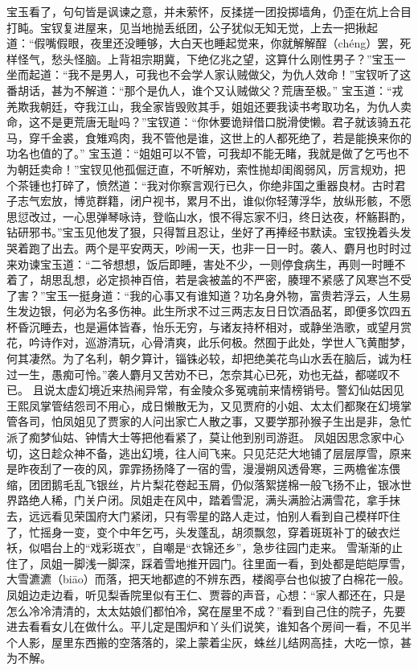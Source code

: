 \documentclass[12pt,oneside]{book}
\begin{document}
宝玉看了，句句皆是讽谏之意，并未萦怀，反揉搓一团投掷墙角，仍歪在炕上合目打盹。宝钗复进屋来，见当地抛丢纸团，公子犹似无知无觉，上去一把揪起道：“假嘴假眼，夜里还没睡够，大白天也睡起觉来，你就解解酲（chéng）罢，死样怪气，愁头怪脑。上背祖宗期冀，下绝亿兆之望，这算什么刚性男子？”宝玉一坐而起道：“我不是男人，可我也不会学人家认贼做父，为仇人效命！”宝钗听了这番胡话，甚为不解道：“那个是仇人，谁个又认贼做父？荒唐至极。”
宝玉道：“戎羌欺我朝廷，夺我江山，我全家皆毁败其手，姐姐还要我读书考取功名，为仇人卖命，这不是更荒唐无耻吗？”宝钗道：“你休要诡辩借口脱滑使懒。君子就该骑五花马，穿千金裘，食雉鸡肉，我不管他是谁，这世上的人都死绝了，若是能换来你的功名也值的了。”
宝玉道：“姐姐可以不管，可我却不能无睹，我就是做了乞丐也不为朝廷卖命！”宝钗见他孤倔迂直，不听解劝，索性抛却闺阁弱风，厉言规劝，把个茶锺也打碎了，愤然道：“我对你察言观行已久，你绝非国之重器良材。古时君子志气宏放，博览群籍，闭户视书，累月不出，谁似你轻薄浮华，放纵形骸，不愿思愆改过，一心思弹琴咏诗，登临山水，恨不得忘家不归，终日达夜，杯觞斟酌，钻研邪书。”宝玉见他发了狠，只得暂且忍让，坐好了再捧经书默读。宝钗挽着头发哭着跑了出去。两个是平安两天，吵闹一天，也非一日一时。袭人、麝月也时时过来劝谏宝玉道：“二爷想想，饭后即睡，害处不少，一则停食病生，再则一时睡不着了，胡思乱想，必定损神百倍，若是衾被盖的不严密，腠理不紧感了风寒岂不受了害？”宝玉一挺身道：“我的心事又有谁知道？功名身外物，富贵若浮云，人生易生发边银，何必为名多伤神。此生所求不过三两志友日日饮酒品茗，即便多饮四五杯昏沉睡去，也是遍体皆春，怡乐无穷，与诸友持杯相对，或静坐浩歌，或望月赏花，吟诗作对，巡游清玩，心骨清爽，此乐何极。然囿于此处，学世人飞黄酣梦，何其凄然。为了名利，朝夕算计，锱铢必较，却把绝美花鸟山水丢在脑后，诚为枉过一生，愚痴可怜。”袭人麝月又苦劝不已，怎奈其心已死，劝也无益，都嗟叹不已。
且说太虚幻境近来热闹异常，有金陵众多冤魂前来情榜销号。警幻仙姑因见王熙凤掌管结怨司不用心，成日懒散无为，又见贾府的小姐、太太们都聚在幻境掌管各司，怕凤姐见了贾家的人问出家亡人散之事，又要学那孙猴子生出是非，急忙派了痴梦仙姑、钟情大士等把他看紧了，莫让他到别司游逛。
凤姐因思念家中心切，这日趁众神不备，逃出幻境，往人间飞来。只见茫茫大地铺了层层厚雪，原来是昨夜刮了一夜的风，霏霏扬扬降了一宿的雪，漫漫朔风透骨寒，三两檐雀冻偎缩，团团鹅毛乱飞银丝，片片梨花卷起玉屑，仍似落絮搓棉一般飞扬不止，银冰世界路绝人稀，门关户闭。凤姐走在风中，踏着雪泥，满头满脸沾满雪花，拿手抹去，远远看见荣国府大门紧闭，只有零星的路人走过，怕别人看到自己模样吓住了，忙摇身一变，变个中年乞丐，头发蓬乱，胡须飘忽，穿着斑斑补丁的破衣烂袄，似唱台上的“戏彩斑衣”，自嘲是“衣锦还乡”，急步往园门走来。
雪渐渐的止住了，凤姐一脚浅一脚深，踩着雪地推开园门。往里面一看，到处都是皑皑厚雪，大雪瀌瀌（biāo）而落，把天地都遮的不辨东西，楼阁亭台也似披了白棉花一般。凤姐边走边看，听见梨香院里似有王仁、贾蓉的声音，心想：“家人都还在，只是怎么冷冷清清的，太太姑娘们都怕冷，窝在屋里不成？”看到自己住的院子，先要进去看看女儿在做什么。平儿定是围炉和丫头们说笑，谁知各个房间一看，不见半个人影，屋里东西搬的空落落的，梁上蒙着尘灰，蛛丝儿结网高挂，大吃一惊，甚为不解。
\end{document}

